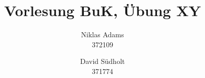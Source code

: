 \documentclass{exercisesheet}
\title{Vorlesung BuK, Übung XY}
\author{
    Niklas Adams  \\ 372109
    \and
    David S\"udholt   \\ 371774
}
\begin{document}
\maketitle
\pointtable
\end{document}
